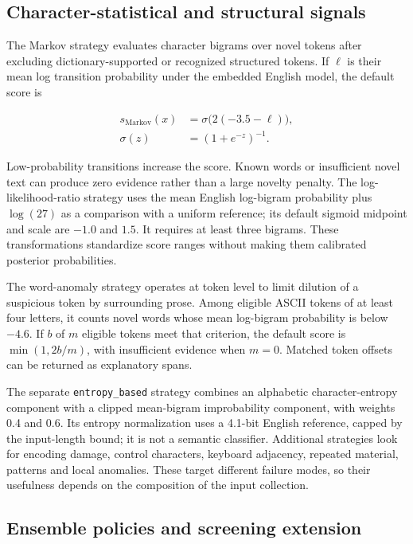 \documentclass[10pt,a4paper,twocolumn]{article}
\begin{document}
\subsection{Character-statistical and structural
signals}\label{character-statistical-and-structural-signals}

The Markov strategy evaluates character bigrams over novel tokens after
excluding dictionary-supported or recognized structured tokens. If
\(\ell\) is their mean log transition probability under the embedded
English model, the default score is

\begin{equation}
\begin{aligned}
s_{\mathrm{Markov}}(x)&=\sigma\bigl(2(-3.5-\ell)\bigr),\\
\sigma(z)&=(1+e^{-z})^{-1}.
\end{aligned}
\end{equation}

Low-probability transitions increase the score. Known words or
insufficient novel text can produce zero evidence rather than a large
novelty penalty. The log-likelihood-ratio strategy uses the mean English
log-bigram probability plus \(\log(27)\) as a comparison with a uniform
reference; its default sigmoid midpoint and scale are \(-1.0\) and
\(1.5\). It requires at least three bigrams. These transformations
standardize score ranges without making them calibrated posterior
probabilities.

The word-anomaly strategy operates at token level to limit dilution of a
suspicious token by surrounding prose. Among eligible ASCII tokens of at
least four letters, it counts novel words whose mean log-bigram
probability is below \(-4.6\). If \(b\) of \(m\) eligible tokens meet
that criterion, the default score is \(\min(1,2b/m)\), with insufficient
evidence when \(m=0\). Matched token offsets can be returned as
explanatory spans.

The separate \texttt{entropy\_based} strategy combines an alphabetic
character-entropy component with a clipped mean-bigram improbability
component, with weights 0.4 and 0.6. Its entropy normalization uses a
4.1-bit English reference, capped by the input-length bound; it is not a
semantic classifier. Additional strategies look for encoding damage,
control characters, keyboard adjacency, repeated material, patterns and
local anomalies. These target different failure modes, so their
usefulness depends on the composition of the input collection.

\subsection{Ensemble policies and screening
extension}\label{ensemble-policies-and-screening-extension}
\end{document}
